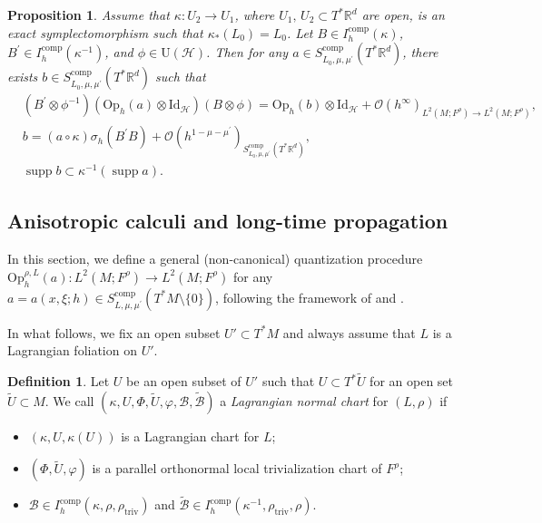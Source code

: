 \documentclass[11pt,oneside,reqno]{amsart}
\newtheorem{proposition}[theorem]{Proposition}
\theoremstyle{definition}
\newtheorem{definition}{Definition}[section]
\numberwithin{equation}{section}
\theoremstyle{plain}
\begin{document}
\begin{proposition}\label{conjugateoffio}
Assume that $\kappa: U_2 \rightarrow U_1$, where $U_1,\,U_2\subset T^* \mathbb{R}^d$ are open, is an exact symplectomorphism such that $\kappa_*\left(L_0\right)=L_0$. Let $B \in I^{\mathrm{comp}}_h(\kappa)$, $B^{\prime} \in I^{\mathrm{comp}}_h (\kappa^{-1} )$, and $\phi\in \mathrm{U}(\mathcal{H})$. Then for any $a \in S_{L_0, \mu, \mu^{\prime}}^{\mathrm{comp}} (T^* \mathbb{R}^d)$, there exists $b \in S_{L_0, \mu, \mu^{\prime}}^{\mathrm{comp}} (T^* \mathbb{R}^d)$ such that
\begin{equation}
\begin{aligned}
&(B^{\prime}\otimes \phi^{-1}) (\mathrm{Op}_h(a)\otimes \mathrm{Id}_{\mathcal{H}})(B\otimes \phi)  =\mathrm{Op}_h(b)\otimes \mathrm{Id}_{\mathcal{H}}+\mathcal{O} (h^{\infty} )_{L^2(M;F^\rho) \rightarrow L^2(M;F^\rho)} ,\\
&b =(a \circ \kappa) \sigma_h (B^{\prime} B )+\mathcal{O} (h^{1-\mu-\mu^{\prime}} )_{S_{L_0, \mu, \mu^{\prime}}^{\mathrm{comp}} (T^* \mathbb{R}^d )} ,\\
&\operatorname{supp} b  \subset \kappa^{-1}(\operatorname{supp} a).
\end{aligned}
\end{equation}
\end{proposition}


\subsection{Anisotropic calculi and long-time propagation}\label{subsec: aniso}

In this section, we define a general (non-canonical) quantization procedure $\mathrm{Op}_h^{\rho, L}(a): L^2(M;F^{\rho})\to L^2(M;F^{\rho})$ for any $a=a(x,\xi;h)\in S^{\mathrm{comp}}_{L,\mu,\mu^{\prime}}(T^*M\setminus \{0\})$, following the framework of \cite[\S 3.3]{dyatlovzahl2016spectral} and \cite[Appendix A.4]{dyatlov2018semiclassical}. 

In what follows, we fix an open subset $U'\subset T^*M$ and always assume that $L$ is a Lagrangian foliation on $U'$.



\begin{definition}
Let $U$ be an open subset of $U'$ such that $U\subset T^*\widetilde{U}$ for an open set $\widetilde{U} \subset M$. We call $(\kappa,U,\Phi,\widetilde{U},\varphi,\mathcal{B},\widetilde{\mathcal{B}})$ a \textit{Lagrangian normal chart} for $(L,\rho)$ if 
\begin{itemize}
    \item $(\kappa,U,\kappa(U))$ is a Lagrangian chart for $L$;
    \item $(\Phi,\widetilde{U},\varphi)$ is a parallel orthonormal local trivialization chart of $F^\rho$;
    \item $\mathcal{B}\in I^{\mathrm{comp}}_h(\kappa,\rho,\rho_{\mathrm{triv}})$ and $\widetilde{\mathcal{B}}\in I^{\mathrm{comp}}_h(\kappa^{-1},\rho_{\mathrm{triv}},\rho)$.
\end{itemize}
\end{definition}
\end{document}

